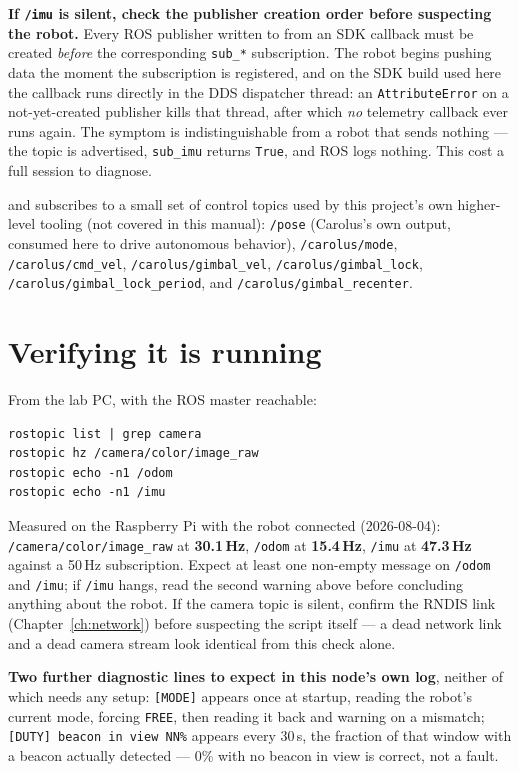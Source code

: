 \documentclass[11pt]{report}
\newenvironment{warningbox}%
  {\begin{lrbox}{\warnbox}\begin{minipage}{0.90\textwidth}}%
  {\end{minipage}\end{lrbox}%
   \begin{center}\fcolorbox{black}{codebg}{\usebox{\warnbox}}\end{center}}
\begin{document}
\begin{warningbox}
\textbf{If \texttt{/imu} is silent, check the publisher creation order
before suspecting the robot.} Every ROS publisher written to from an SDK
callback must be created \emph{before} the corresponding
\texttt{sub\_*} subscription. The robot begins pushing data the moment the
subscription is registered, and on the SDK build used here the callback runs
directly in the DDS dispatcher thread: an \texttt{AttributeError} on a
not-yet-created publisher kills that thread, after which \emph{no} telemetry
callback ever runs again. The symptom is indistinguishable from a robot that
sends nothing --- the topic is advertised, \texttt{sub\_imu} returns
\texttt{True}, and ROS logs nothing. This cost a full session to diagnose.
\end{warningbox}

and subscribes to a small set of control topics used by this project's own
higher-level tooling (not covered in this manual):
\texttt{/pose} (Carolus's own output, consumed here to drive autonomous
behavior), \texttt{/carolus/mode}, \texttt{/carolus/cmd\_vel},
\texttt{/carolus/gimbal\_vel}, \texttt{/carolus/gimbal\_lock},
\texttt{/carolus/gimbal\_lock\_period}, and \texttt{/carolus/gimbal\_recenter}.

\section{Verifying it is running}

From the lab PC, with the ROS master reachable:

\begin{lstlisting}[style=shell]
rostopic list | grep camera
rostopic hz /camera/color/image_raw
rostopic echo -n1 /odom
rostopic echo -n1 /imu
\end{lstlisting}

Measured on the Raspberry Pi with the robot connected (2026-08-04):
\texttt{/camera/color/image\_raw} at \textbf{30.1\,Hz},
\texttt{/odom} at \textbf{15.4\,Hz}, \texttt{/imu} at \textbf{47.3\,Hz}
against a 50\,Hz subscription. Expect at least one non-empty message on
\texttt{/odom} and \texttt{/imu}; if \texttt{/imu} hangs, read the second
warning above before concluding anything about the robot.
If the camera topic is silent, confirm the RNDIS link
(Chapter~\ref{ch:network}) before suspecting the script itself --- a dead
network link and a dead camera stream look identical from this check alone.

\textbf{Two further diagnostic lines to expect in this node's own log},
neither of which needs any setup: \texttt{[MODE]} appears once at startup,
reading the robot's current mode, forcing \texttt{FREE}, then reading it
back and warning on a mismatch; \texttt{[DUTY] beacon in view NN\%} appears
every 30\,s, the fraction of that window with a beacon actually detected
--- 0\% with no beacon in view is correct, not a fault.
\end{document}
